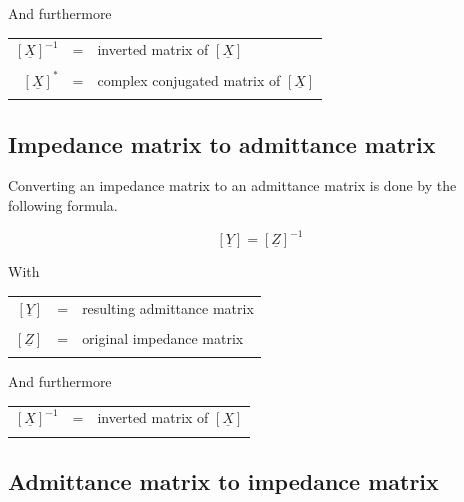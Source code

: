 \documentclass[10pt]{report}
\begin{document}
And furthermore

\addvspace{12pt}

\begin{tabular}{rll}
$\left[\underline{X}\right]^{-1}$ & = & 
inverted matrix of $\left[\underline{X}\right]$\\& &\\
$\left[\underline{X}\right]^{*}$ & = & 
complex conjugated matrix of $\left[\underline{X}\right]$\\& &\\
\end{tabular}

\subsection{Impedance matrix to admittance matrix}

Converting an impedance matrix to an admittance matrix is done by the
following formula.

\begin{equation}
\left[
\underline{Y}
\right]
=
\left[
\underline{Z}
\right]^{-1}
\end{equation}

With

\addvspace{12pt}

\begin{tabular}{rll}
$\left[\underline{Y}\right]$ & = & resulting admittance matrix\\& &\\
$\left[\underline{Z}\right]$ & = & original impedance matrix\\& &\\
\end{tabular}

And furthermore

\addvspace{12pt}

\begin{tabular}{rll}
$\left[\underline{X}\right]^{-1}$ & = & 
inverted matrix of $\left[\underline{X}\right]$\\& &\\
\end{tabular}

\subsection{Admittance matrix to impedance matrix}
\end{document}
